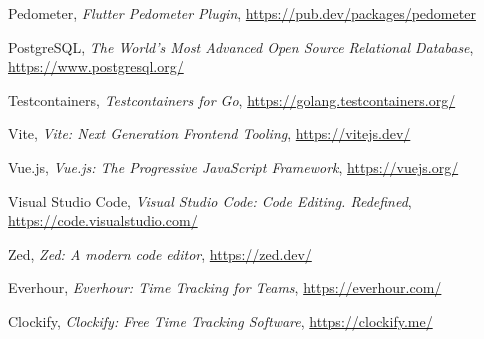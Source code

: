 \documentclass[11pt,a4paper]{article}
\begin{document}
\begin{thebibliography}{9}
Pedometer, \emph{Flutter Pedometer Plugin}, \url{https://pub.dev/packages/pedometer}

PostgreSQL, \emph{The World's Most Advanced Open Source Relational Database}, \url{https://www.postgresql.org/}

Testcontainers, \emph{Testcontainers for Go}, \url{https://golang.testcontainers.org/}

Vite, \emph{Vite: Next Generation Frontend Tooling}, \url{https://vitejs.dev/}

Vue.js, \emph{Vue.js: The Progressive JavaScript Framework}, \url{https://vuejs.org/}

Visual Studio Code, \emph{Visual Studio Code: Code Editing. Redefined}, \url{https://code.visualstudio.com/}

Zed, \emph{Zed: A modern code editor}, \url{https://zed.dev/}

Everhour, \emph{Everhour: Time Tracking for Teams}, \url{https://everhour.com/}

Clockify, \emph{Clockify: Free Time Tracking Software}, \url{https://clockify.me/}
\end{thebibliography}
\end{document}
